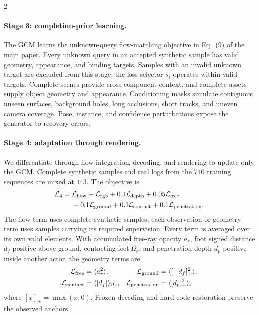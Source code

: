 \begin{multicols}{2}
\paragraph{Stage 3: completion-prior learning.}
The GCM learns the unknown-query flow-matching objective in Eq.~(9) of the main paper. Every unknown query in an accepted synthetic sample has valid geometry, appearance, and binding targets. Samples with an invalid unknown target are excluded from this stage; the loss selector $s_i$ operates within valid targets. Complete scenes provide cross-component context, and complete assets supply object geometry and appearance. Conditioning masks simulate contiguous unseen surfaces, background holes, long occlusions, short tracks, and uneven camera coverage. Pose, instance, and confidence perturbations expose the generator to recovery errors.

\paragraph{Stage 4: adaptation through rendering.}
We differentiate through flow integration, decoding, and rendering to update only the GCM. Complete synthetic samples and real logs from the 740 training sequences are mixed at $1{:}3$. The objective is
\begin{align}
\mathcal L_4={}&\mathcal L_{\rm flow}+\mathcal L_{\rm rgb}
+0.1\mathcal L_{\rm depth}+0.05\mathcal L_{\rm free}\nonumber\\
&+0.1\mathcal L_{\rm ground}+0.1\mathcal L_{\rm contact}
+0.1\mathcal L_{\rm penetration}.
\label{eq:adaptation}
\end{align}
The flow term uses complete synthetic samples; each observation or geometry term uses samples carrying its required supervision. Every term is averaged over its own valid elements. With accumulated free-ray opacity $a_r$, foot signed distance $d_f$ positive above ground, contacting feet $\Omega_c$, and penetration depth $d_p$ positive inside another actor, the geometry terms are
\begin{align}
\mathcal L_{\rm free}&=\langle a_r^2\rangle,&
\mathcal L_{\rm ground}&=\langle[-d_f]_+^2\rangle,\nonumber\\
\mathcal L_{\rm contact}&=\langle|d_f|\rangle_{\Omega_c},&
\mathcal L_{\rm penetration}&=\langle[d_p]_+^2\rangle,
\end{align}
where $[x]_+=\max(x,0)$. Frozen decoding and hard code restoration preserve the observed anchors.

\end{multicols}
